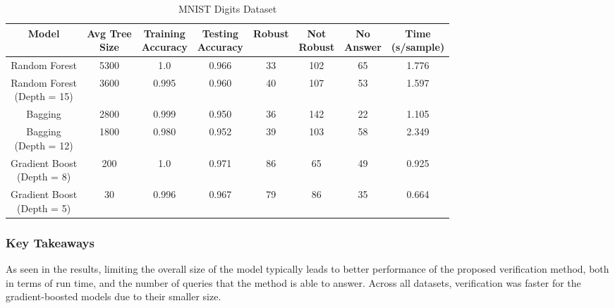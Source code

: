 \documentclass[pageno]{jpaper}
\begin{document}
\begin{doublespacing}
\begin{table}[p]
\centering
\begin{tabular}{| c | c c c c c c c |} 
 \hline
 Model & \makecell{Avg Tree \\ Size} & \makecell{Training \\ Accuracy} & \makecell{Testing \\ Accuracy} & Robust & \makecell{Not \\ Robust} & \makecell{No \\ Answer} & \makecell{Time  \\ (s/sample)} \\ [0.5ex] 
 \hline\hline
Random Forest 					& 5300 & 1.0 & 0.966 & 33 & 102 & 65 & 1.776 \\ \hline
\makecell{Random Forest \\ (Depth = 15)} & 3600 & 0.995 & 0.960 & 40 & 107 & 53 & 1.597 \\ \hline
Bagging 						& 2800 & 0.999 & 0.950 & 36 & 142 & 22 & 1.105 \\ \hline
\makecell{Bagging \\ (Depth = 12)}		& 1800 & 0.980 & 0.952 & 39 & 103 & 58 & 2.349 \\ \hline
\makecell{Gradient Boost \\ (Depth = 8)}	& 200 & 1.0 & 0.971 & 86 & 65 & 49 & 0.925 \\ \hline
\makecell{Gradient Boost \\ (Depth = 5)} 	& 30 & 0.996 & 0.967 & 79 & 86 & 35 & 0.664 \\ [1ex] 
 \hline
\end{tabular}
\caption{MNIST Digits Dataset}
\label{table:mnist}
\end{table}

\subsubsection{Key Takeaways}
As seen in the results, limiting the overall size of the model typically leads to better performance of the proposed verification method, both in terms of run time, and the number of queries that the method is able to answer. Across all datasets, verification was faster for the gradient-boosted models due to their smaller size.


\end{doublespacing}
\end{document}
